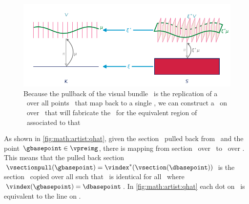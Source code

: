 \documentclass[../main.tex]{subfiles}
\begin{document}
\begin{figure}[H]
    \centering
      \includegraphics[width=1\textwidth]{figures/math/q_hat.png}
      \caption{Because the pullback of the visual bundle \vtotalpull\ is the replication of a \vsection\ over all points \gbasepoint\ that map back to a single \dbasepoint, we can construct a \vmarkd\ on \vsection\ over \dbasepoint\ that will fabricate the \vmark\ for the equivalent region of \gbasepoint\ associated to that \dbasepoint}
      \label{fig:math:artist:qhat}
  \end{figure}
  
As shown in \autoref{fig:math:artist:qhat}, given the section \vsectionpull\ pulled back from \vsection\ and the point $\gbasepoint \in \vpreimg$, there is mapping from section \vsectionpull\ over \gbasepoint\ to \vsection\ over \dbasepoint. This means that the pulled back section $\vsectionpull(\gbasepoint) = \vindex^*(\vsection(\dbasepoint))$ is the section \vsection\ copied over all \gbasepoint such that \vsectionpull\ is identical for all \gbasepoint\ where $\vindex(\gbasepoint) = \dbasepoint$. In \autoref{fig:math:artist:qhat} each dot on \vfiber\ is equivalent to the line on \vfiberpull. 
\end{document}
